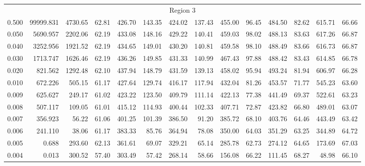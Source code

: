 \begin{tabular}{@{}lrrrrrrrrrrrrr@{}}
\midrule
\multicolumn{14}{c}{Region 3} \\
\cmidrule{1-14}
0.500 & 99999.831 & 4730.65 & 62.81 & 426.70 & 143.35 & 424.02 & 137.43 & 455.00 & 96.45 & 484.50 & 82.62 & 615.71 & 66.66 \\
0.050 & 5690.957 & 2202.06 & 62.19 & 433.08 & 148.16 & 429.22 & 140.41 & 459.03 & 98.02 & 488.13 & 83.63 & 617.26 & 66.87 \\
0.040 & 3252.956 & 1921.52 & 62.19 & 434.65 & 149.01 & 430.20 & 140.81 & 459.58 & 98.10 & 488.49 & 83.66 & 616.73 & 66.87 \\
0.030 & 1713.747 & 1626.46 & 62.19 & 436.26 & 149.85 & 431.33 & 140.99 & 467.43 & 97.88 & 488.42 & 83.43 & 614.85 & 66.78 \\
0.020 & 821.562 & 1292.48 & 62.10 & 437.94 & 148.79 & 431.59 & 139.13 & 458.02 & 95.94 & 493.24 & 81.94 & 606.97 & 66.28 \\
0.010 & 672.226 & 505.15 & 61.17 & 427.64 & 129.74 & 416.17 & 117.94 & 432.04 & 81.26 & 453.57 & 71.77 & 545.23 & 63.60 \\
0.009 & 625.627 & 249.17 & 61.02 & 423.22 & 123.50 & 409.79 & 111.14 & 422.13 & 77.38 & 441.49 & 69.37 & 522.61 & 63.23 \\
0.008 & 507.117 & 109.05 & 61.01 & 415.12 & 114.93 & 400.44 & 102.33 & 407.71 & 72.87 & 423.82 & 66.80 & 489.01 & 63.07 \\
0.007 & 356.923 & 56.22 & 61.06 & 401.25 & 101.39 & 386.50 & 91.20 & 385.72 & 68.10 & 403.76 & 64.46 & 443.49 & 63.42 \\
0.006 & 241.110 & 38.06 & 61.17 & 383.33 & 85.76 & 364.94 & 78.08 & 350.00 & 64.03 & 351.29 & 63.25 & 344.89 & 64.72 \\
0.005 & 0.688 & 293.60 & 62.13 & 361.61 & 69.07 & 329.21 & 65.14 & 285.78 & 62.73 & 274.12 & 64.65 & 173.69 & 67.03 \\
0.004 & 0.013 & 300.52 & 57.40 & 303.49 & 57.42 & 268.14 & 58.66 & 156.08 & 66.22 & 111.45 & 68.27 & 48.98 & 66.10 \\

\bottomrule
\end{tabular}
